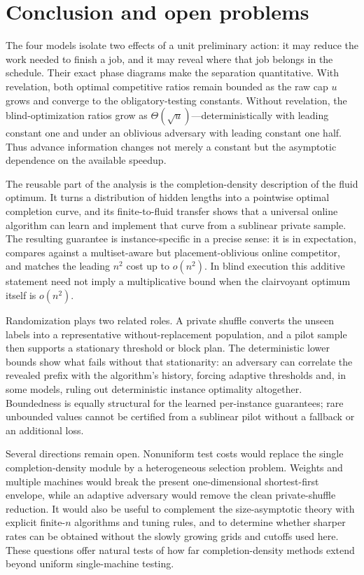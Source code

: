 \section{Conclusion and open problems}
\label{sec:conclusion}

The four models isolate two effects of a unit preliminary action: it may
reduce the work needed to finish a job, and it may reveal where that job
belongs in the schedule.  Their exact phase diagrams make the separation
quantitative.  With revelation, both optimal competitive ratios remain
bounded as the raw cap $u$ grows and converge to the obligatory-testing
constants.  Without revelation, the blind-optimization ratios grow as
$\Theta(\sqrt u)$---deterministically with leading constant one and under an
oblivious adversary with leading constant one half.  Thus advance
information changes not merely a constant but the asymptotic dependence on
the available speedup.

The reusable part of the analysis is the completion-density description of
the fluid optimum.  It turns a distribution of hidden lengths into a
pointwise optimal completion curve, and its finite-to-fluid transfer shows
that a universal online algorithm can learn and implement that curve from a
sublinear private sample.  The resulting guarantee is instance-specific in
a precise sense: it is in expectation, compares against a multiset-aware but
placement-oblivious online competitor, and matches the leading $n^2$ cost up
to $o(n^2)$.  In blind execution this additive statement need not imply a
multiplicative bound when the clairvoyant optimum itself is $o(n^2)$.

Randomization plays two related roles.  A private shuffle converts the
unseen labels into a representative without-replacement population, and a
pilot sample then supports a stationary threshold or block plan.  The
deterministic lower bounds show what fails without that stationarity: an
adversary can correlate the revealed prefix with the algorithm's history,
forcing adaptive thresholds and, in some models, ruling out deterministic
instance optimality altogether.  Boundedness is equally structural for the
learned per-instance guarantees; rare unbounded values cannot be certified
from a sublinear pilot without a fallback or an additional loss.

Several directions remain open.  Nonuniform test costs would replace the
single completion-density module by a heterogeneous selection problem.
Weights and multiple machines would break the present one-dimensional
shortest-first envelope, while an adaptive adversary would remove the clean
private-shuffle reduction.  It would also be useful to complement the
size-asymptotic theory with explicit finite-$n$ algorithms and tuning rules,
and to determine whether sharper rates can be obtained without the slowly
growing grids and cutoffs used here.  These questions offer natural tests of
how far completion-density methods extend beyond uniform single-machine
testing.
